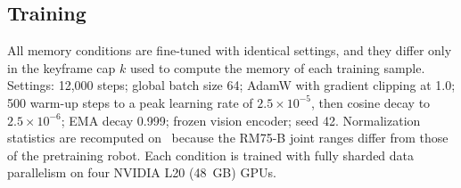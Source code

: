 \subsection{Training}
\label{sec:training}
All memory conditions are fine-tuned with identical settings, and they differ only in the keyframe cap $k$ used to compute the memory of each training sample. Settings: 12{,}000 steps; global batch size 64; AdamW with gradient clipping at 1.0; 500 warm-up steps to a peak learning rate of $2.5\times10^{-5}$, then cosine decay to $2.5\times10^{-6}$; EMA decay 0.999; frozen vision encoder; seed 42. Normalization statistics are recomputed on \bench\ because the RM75-B joint ranges differ from those of the pretraining robot. Each condition is trained with fully sharded data parallelism on four NVIDIA L20 (48~GB) GPUs.
